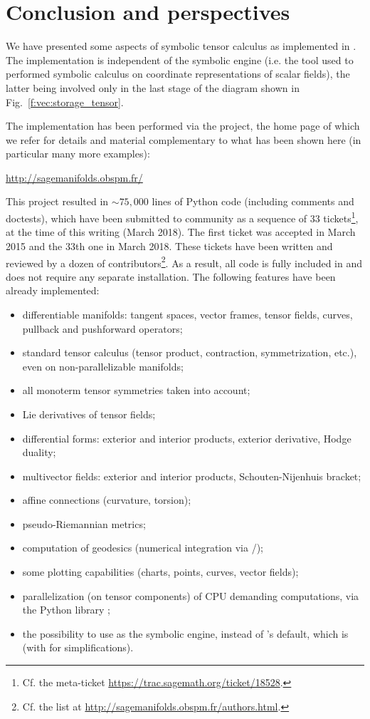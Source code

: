 \chapter{Conclusion and perspectives} \label{s:con}

We have presented some aspects of symbolic tensor calculus as implemented
in \Sage{}. The implementation is independent of the symbolic engine (i.e. the
tool used to performed symbolic calculus on coordinate representations of
scalar fields), the latter being involved only in the last stage of the diagram
shown in Fig.~\ref{f:vec:storage_tensor}.

The implementation has been performed via the 
project, the home page of which we refer for details and material complementary
to what has been shown here (in particular many more examples):
\begin{center}
\url{http://sagemanifolds.obspm.fr/}
\end{center}
This project resulted in $\sim 75,000$ lines of Python code (including comments and doctests), which have been submitted to \Sage{} community as a sequence of
33 tickets\footnote{Cf. the meta-ticket \url{https://trac.sagemath.org/ticket/18528}.},
at the time of this writing (March 2018). The
first ticket was accepted in March 2015 and the 33th one in March 2018.
These tickets have been written and reviewed by a dozen of
contributors\footnote{Cf. the list at \url{http://sagemanifolds.obspm.fr/authors.html}.}.
As a result, all code is fully included in  and does not require
any separate installation. The following features have been already implemented:
\begin{itemize}
\item differentiable manifolds: tangent spaces, vector frames, tensor fields, curves, pullback and pushforward operators;
\item standard tensor calculus (tensor product, contraction, symmetrization, etc.), even on non-parallelizable manifolds;
\item all monoterm tensor symmetries taken into account;
\item Lie derivatives of tensor fields;
\item differential forms: exterior and interior products, exterior derivative,
Hodge duality;
\item multivector fields: exterior and interior products, Schouten-Nijenhuis bracket;
\item affine connections (curvature, torsion);
\item pseudo-Riemannian metrics;
\item computation of geodesics (numerical integration via \Sage{}/);
\item some plotting capabilities (charts, points, curves, vector fields);
\item parallelization (on tensor components) of CPU demanding computations,
via the Python library ;
\item the possibility to use  as the symbolic engine, instead of
\Sage{}'s default, which is  (with  for simplifications).
\end{itemize}
